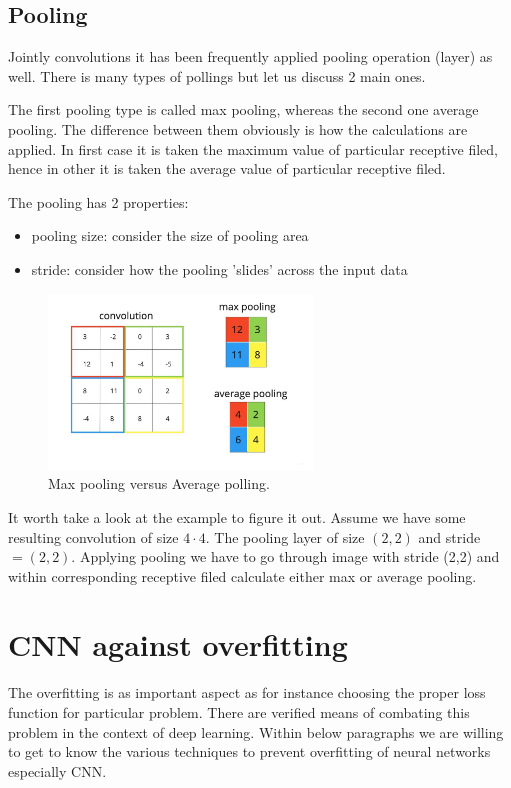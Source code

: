 \subsection{Pooling}
Jointly convolutions it has been frequently applied pooling operation (layer) as well. There is many types of pollings but let us discuss 2 main ones. 

The first pooling type is called max pooling, whereas the second one average pooling. The difference between them obviously is how the calculations are applied. In first case it is taken the maximum value of particular receptive filed, hence in other it is taken the average value of particular receptive filed.

The pooling has 2 properties:
\begin{itemize}
    \item pooling size: consider the size of pooling area 
    \item stride: consider how the pooling 'slides' across the input data 
\end{itemize}    

\begin{figure}[h]
    \centering \includegraphics[width=7cm]{images/pooling.jpg}
    \caption {Max pooling versus Average polling.}
\end{figure}

It worth take a look at the example to figure it out. Assume we have some resulting convolution of size $4 \cdot 4$. The pooling layer of size $(2, 2)$ and stride $ = (2, 2)$. 
Applying pooling we have to go through image with stride (2,2) and within corresponding receptive filed calculate either max or average pooling.  

\section{CNN against overfitting}
The overfitting is as important aspect as for instance choosing the proper loss function for particular problem. There are verified means of combating this problem in the context of deep learning. Within below paragraphs we are willing to get to know the various techniques to prevent overfitting of neural networks especially CNN. 

